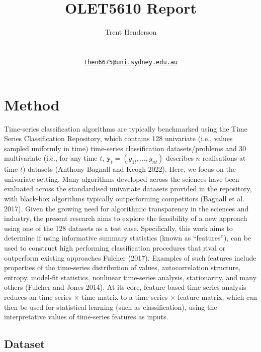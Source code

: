 \documentclass{article}
\title{OLET5610 Report}
\author{
    Trent Henderson
   \\
     \\
   \\
  \texttt{\href{mailto:then6675@uni.sydney.edu.au}{\nolinkurl{then6675@uni.sydney.edu.au}}} \\
  }
\begin{document}
\maketitle

\def\tightlist{}


\begin{abstract}

\end{abstract}


\hypertarget{method}{%
\section{Method}\label{method}}

Time-series classification algorithms are typically benchmarked using
the Time Series Classification Repository, which contains 128 univariate
(i.e., values sampled uniformly in time) time-series classification
datasets/problems and 30 multivariate (i.e., for any time \(t\),
\(\mathbf{y}_{t} = (y_{1t},\ldots, y_{nt})\) describes \(n\)
realisations at time \(t\)) datasets (Anthony Bagnall and Keogh 2022).
Here, we focus on the univariate setting. Many algorithms developed
across the sciences have been evaluated across the standardised
univariate datasets provided in the repository, with black-box
algorithms typically outperforming competitors (Bagnall et al. 2017).
Given the growing need for algorithmic transparency in the sciences and
industry, the present research aims to explore the feasibility of a new
approach using one of the 128 datasets as a test case. Specifically,
this work aims to determine if using informative summary statistics
(known as ``features''), can be used to construct high performing
classification procedures that rival or outperform existing approaches
Fulcher (2017). Examples of such features include properties of the
time-series distribution of values, autocorrelation structure, entropy,
model-fit statistics, nonlinear time-series analysis, stationarity, and
many others (Fulcher and Jones 2014). At its core, feature-based
time-series analysis reduces an time series \(\times\) time matrix to a
time series \(\times\) feature matrix, which can then be used for
statistical learning (such as classification), using the interpretative
values of time-series features as inputs.

\hypertarget{dataset}{%
\subsection{Dataset}\label{dataset}}
\end{document}
